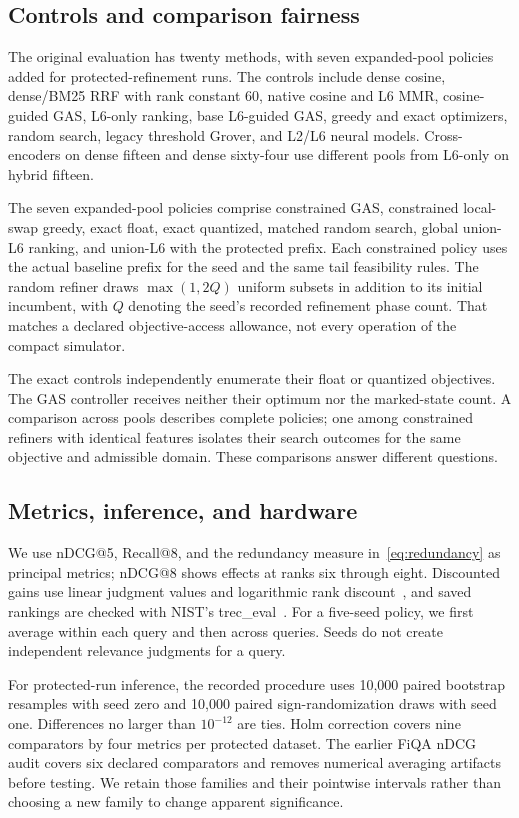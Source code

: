\subsection{Controls and comparison fairness}
The original evaluation has twenty methods, with seven expanded-pool policies added for protected-refinement runs. The controls include dense cosine, dense/BM25 RRF with rank constant 60, native cosine and L6 MMR, cosine-guided GAS, L6-only ranking, base L6-guided GAS, greedy and exact optimizers, random search, legacy threshold Grover, and L2/L6 neural models. Cross-encoders on dense fifteen and dense sixty-four use different pools from L6-only on hybrid fifteen.

The seven expanded-pool policies comprise constrained GAS, constrained local-swap greedy, exact float, exact quantized, matched random search, global union-L6 ranking, and union-L6 with the protected prefix. Each constrained policy uses the actual baseline prefix for the seed and the same tail feasibility rules. The random refiner draws $\max(1,2Q)$ uniform subsets in addition to its initial incumbent, with $Q$ denoting the seed's recorded refinement phase count. That matches a declared objective-access allowance, not every operation of the compact simulator.

The exact controls independently enumerate their float or quantized objectives. The GAS controller receives neither their optimum nor the marked-state count. A comparison across pools describes complete policies; one among constrained refiners with identical features isolates their search outcomes for the same objective and admissible domain. These comparisons answer different questions.

\subsection{Metrics, inference, and hardware}
We use nDCG@5, Recall@8, and the redundancy measure in~\eqref{eq:redundancy} as principal metrics; nDCG@8 shows effects at ranks six through eight. Discounted gains use linear judgment values and logarithmic rank discount~\cite{jarvelin2002gain}, and saved rankings are checked with NIST's trec\_eval~\cite{trec_eval}. For a five-seed policy, we first average within each query and then across queries. Seeds do not create independent relevance judgments for a query.

For protected-run inference, the recorded procedure uses 10,000 paired bootstrap resamples with seed zero and 10,000 paired sign-randomization draws with seed one. Differences no larger than $10^{-12}$ are ties. Holm correction covers nine comparators by four metrics per protected dataset. The earlier FiQA nDCG audit covers six declared comparators and removes numerical averaging artifacts before testing. We retain those families and their pointwise intervals rather than choosing a new family to change apparent significance.

